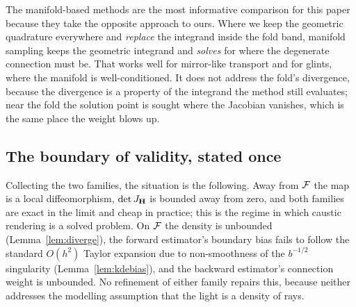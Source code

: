 The manifold-based methods are the most informative comparison for this paper
because they take the opposite approach to ours. Where we keep the geometric
quadrature everywhere and \emph{replace} the integrand inside the fold band,
manifold sampling keeps the geometric integrand and \emph{solves} for where the
degenerate connection must be. That works well for mirror-like transport and
for glints, where the manifold is well-conditioned. It does not address the
fold's divergence, because the divergence is a property of the integrand the
method still evaluates; near the fold the solution point is sought where the
Jacobian vanishes, which is the same place the weight blows up.

\subsection{The boundary of validity, stated once}
\label{sec:validity}

Collecting the two families, the situation is the following. Away from $\mathcal{F}$
the map is a local diffeomorphism, $\det J_{\mathbf{H}}$ is bounded away from zero, and both
families are exact in the limit and cheap in practice; this is the regime in
which caustic rendering is a solved problem. On $\mathcal{F}$ the density is
unbounded (Lemma~\ref{lem:diverge}), the forward estimator's boundary bias
fails to follow the standard $O(h^2)$ Taylor expansion due to non-smoothness
of the $b^{-1/2}$ singularity (Lemma~\ref{lem:kdebias}), and the backward
estimator's connection weight is unbounded. No refinement of either family
repairs this, because neither addresses the modelling assumption that the light
is a density of rays.

